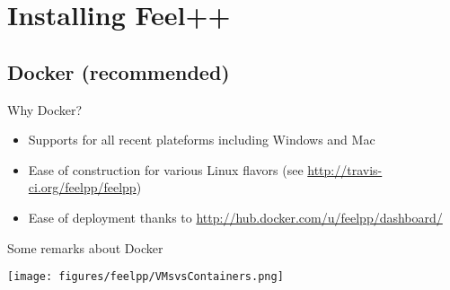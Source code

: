 \section{Installing Feel++}

\subsection{Docker (recommended)}

\begin{frame}{Why Docker?}
  \begin{itemize}
  \item Supports for all recent plateforms including Windows and Mac
  \item Ease of construction for various Linux flavors (see \url{http://travis-ci.org/feelpp/feelpp})
  \item Ease of deployment thanks to \url{http://hub.docker.com/u/feelpp/dashboard/}
  \end{itemize}
\end{frame}
\begin{frame}{Some remarks about Docker}
  \begin{center}
  \texttt{[image: figures/feelpp/VMsvsContainers.png]}
  \end{center}

\end{frame}
